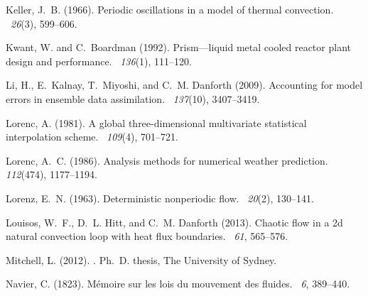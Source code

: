 \documentclass[12pt]{report}
\begin{document}
\begin{thebibliography}{}
Keller, J.~B. (1966).
\newblock Periodic oscillations in a model of thermal convection.
~{\em 26\/}(3), 599--606.

Kwant, W. and C.~Boardman (1992).
\newblock Prism—liquid metal cooled reactor plant design and performance.
~{\em 136\/}(1), 111--120.

Li, H., E.~Kalnay, T.~Miyoshi, and C.~M. Danforth (2009).
\newblock Accounting for model errors in ensemble data assimilation.
~{\em 137\/}(10), 3407--3419.

Lorenc, A. (1981).
\newblock A global three-dimensional multivariate statistical interpolation
  scheme.
~{\em 109\/}(4), 701--721.

Lorenc, A.~C. (1986).
\newblock Analysis methods for numerical weather prediction.
~{\em
  112\/}(474), 1177--1194.

Lorenz, E.~N. (1963).
\newblock Deterministic nonperiodic flow.
~{\em 20\/}(2), 130--141.

Louisos, W.~F., D.~L. Hitt, and C.~M. Danforth (2013).
\newblock Chaotic flow in a 2d natural convection loop with heat flux
  boundaries.
~{\em 61},
  565--576.

Mitchell, L. (2012).
.
\newblock Ph.\ D. thesis, The University of Sydney.

Navier, C. (1823).
\newblock M{\'e}moire sur les lois du mouvement des fluides.
~{\em 6}, 389--440.


\end{thebibliography}
\end{document}

